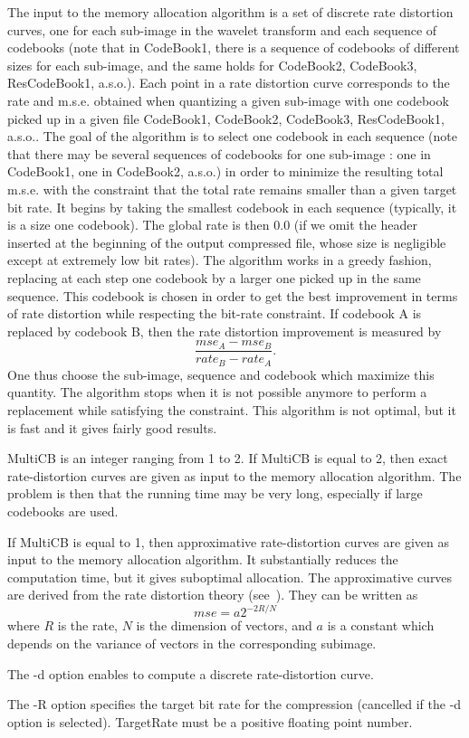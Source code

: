The input to the memory allocation algorithm is a set of discrete rate 
distortion curves, one for each sub-image in the wavelet transform 
and each sequence of codebooks (note that in CodeBook1, there is a 
sequence of codebooks of different sizes for each sub-image, and the 
same holds for CodeBook2, CodeBook3, ResCodeBook1, a.s.o.). 
Each point in a rate distortion curve corresponds to the rate and m.s.e. 
obtained when quantizing a given sub-image with one codebook 
picked up in a given file CodeBook1, CodeBook2, CodeBook3, ResCodeBook1, 
a.s.o.. The goal of the algorithm is to select one codebook in each 
sequence (note that there may be several sequences of codebooks for 
one sub-image : one in CodeBook1, one in CodeBook2, a.s.o.) 
in order to minimize the resulting total m.s.e. with 
the constraint that the total rate remains smaller than a given 
target bit rate. It begins by taking the smallest codebook in each sequence 
(typically, it is a size one codebook). The global rate is then 0.0 
(if we omit the header inserted at the beginning of the output compressed 
file, whose size is negligible except at extremely low bit rates). 
The algorithm works in a greedy fashion, replacing at each step 
one codebook by a larger one picked up in the same sequence. 
This codebook is chosen in order to get the best improvement 
in terms of rate distortion while respecting the bit-rate constraint. 
If codebook A is replaced by codebook B, then the rate distortion improvement
is measured by 
\[
\frac{mse_A - mse_B}{rate_B - rate_A}.
\]
One thus choose the sub-image, sequence and codebook which maximize this 
quantity. The algorithm stops when it is not possible anymore to perform 
a replacement while satisfying the constraint. This algorithm is not optimal, 
but it is fast and it gives fairly good results. 

MultiCB is an integer ranging from 1 to 2. If MultiCB is equal to 2, 
then exact rate-distortion curves are given as input to the 
memory allocation algorithm. The problem is then that the running time may be 
very long, especially if large codebooks are used. 

If MultiCB is equal to 1, then approximative rate-distortion curves are given 
as input to the memory allocation algorithm. It substantially reduces 
the computation time, but it gives suboptimal allocation. 
The approximative curves are derived from the rate distortion theory 
(see~\cite{gersho.gray:vector}). They can be written as 
\[
mse = a 2^{-2R/N}
\]
where $R$ is the rate, $N$ is the dimension of vectors, and $a$ is a constant 
which depends on the variance of vectors in the corresponding subimage. 

The -d option enables to compute a discrete rate-distortion curve. 

The -R option specifies the target bit rate for the compression (cancelled 
if the -d option is selected). TargetRate must be  a positive floating point 
number. 


